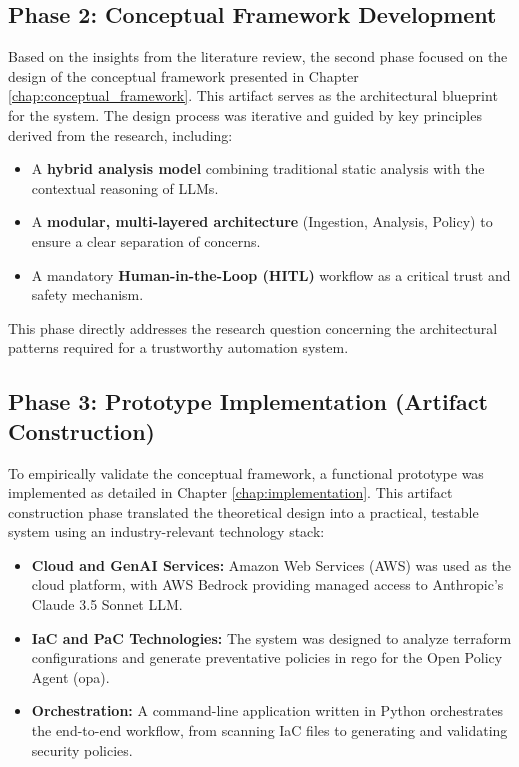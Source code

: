 \subsection{Phase 2: Conceptual Framework Development}
Based on the insights from the literature review, the second phase focused on the design of the conceptual framework presented in Chapter \ref{chap:conceptual_framework}. This artifact serves as the architectural blueprint for the system. The design process was iterative and guided by key principles derived from the research, including:
\begin{itemize}
    \item A \textbf{hybrid analysis model} combining traditional static analysis with the contextual reasoning of LLMs.
    \item A \textbf{modular, multi-layered architecture} (Ingestion, Analysis, Policy) to ensure a clear separation of concerns.
    \item A mandatory \textbf{Human-in-the-Loop (HITL)} workflow as a critical trust and safety mechanism.
\end{itemize}
This phase directly addresses the research question concerning the architectural patterns required for a trustworthy automation system.

\subsection{Phase 3: Prototype Implementation (Artifact Construction)}
To empirically validate the conceptual framework, a functional prototype was implemented as detailed in Chapter \ref{chap:implementation}. This artifact construction phase translated the theoretical design into a practical, testable system using an industry-relevant technology stack:
\begin{itemize}
    \item \textbf{Cloud and GenAI Services:} Amazon Web Services (AWS) was used as the cloud platform, with AWS Bedrock providing managed access to Anthropic's Claude 3.5 Sonnet LLM.
    \item \textbf{IaC and PaC Technologies:} The system was designed to analyze \gls{terraform} configurations and generate preventative policies in \gls{rego} for the Open Policy Agent (\gls{opa}).
    \item \textbf{Orchestration:} A command-line application written in Python orchestrates the end-to-end workflow, from scanning IaC files to generating and validating security policies.
\end{itemize}

